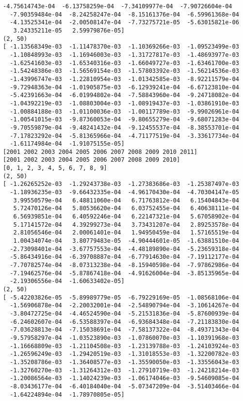 \documentclass[11pt]{article}
\begin{document}
\begin{Verbatim}[commandchars=\\\{\}]
  -4.75614743e-04  -6.13758259e-04  -7.34109977e-04  -7.90726604e-04
  -7.90359484e-04  -8.24258247e-04  -8.15161376e-04  -6.59961368e-04
  -4.13525341e-04  -2.00508147e-04  -7.73275721e-05  -5.63015821e-06
   3.24335211e-05   2.59979876e-05]
(2, 50)
[ -1.13568349e-03  -1.11478370e-03  -1.10369266e-03  -1.09523499e-03
  -1.10848993e-03  -1.16946003e-03  -1.31727817e-03  -1.48693977e-03
  -1.62541603e-03  -1.65340316e-03  -1.66049727e-03  -1.63461700e-03
  -1.54248386e-03  -1.56569154e-03  -1.57803392e-03  -1.56214536e-03
  -1.43996747e-03  -1.22810954e-03  -1.01342585e-03  -8.92211579e-04
  -9.72948363e-04  -1.01905875e-03  -6.12939241e-04  -6.67123810e-04
  -5.42391663e-04  -6.01994802e-04  -7.58843960e-04  -9.24718082e-04
  -1.04392219e-03  -1.08803004e-03  -1.08919437e-03  -1.03861910e-03
  -1.00884188e-03  -1.01100036e-03  -1.00117789e-03  -9.99026961e-04
  -1.00541015e-03  -9.87360053e-04  -9.80655279e-04  -9.68071283e-04
  -9.70559879e-04  -9.48241432e-04  -9.12455537e-04  -8.38553701e-04
  -7.17823292e-04  -5.81365966e-04  -4.71177519e-04  -3.33617734e-04
  -1.61174984e-04  -1.91075155e-05]
[2001 2002 2003 2004 2005 2006 2007 2008 2009 2010 2011]
[2001 2002 2003 2004 2005 2006 2007 2008 2009 2010]
[0, 1, 2, 3, 4, 5, 6, 7, 8, 9]
(2, 50)
[ -1.26265252e-03  -1.29243738e-03  -1.27383686e-03  -1.25387497e-03
  -1.18936235e-03  -9.66432335e-04  -4.96170430e-04  -4.70304147e-05
   3.99550579e-04   6.48811060e-04   6.71763812e-04   6.15404843e-04
   5.72470126e-04   5.80536620e-04   6.03752455e-04   6.40638111e-04
   6.56939851e-04   6.40592246e-04   6.22147321e-04   5.67058902e-04
   5.17141572e-04   4.39299273e-04   3.73431207e-04   2.89253578e-04
   2.81056546e-04   2.00061401e-04   1.94950459e-04   1.57165519e-04
   1.00434074e-04   3.80779483e-05  -4.90444601e-05  -1.63881510e-04
  -2.73098401e-04  -3.67757553e-04  -4.48189890e-04  -5.23659318e-04
  -5.86434916e-04  -6.39708887e-04  -6.77914630e-04  -7.19112177e-04
  -7.70782574e-04  -8.07313238e-04  -8.15940598e-04  -7.97862986e-04
  -7.19462576e-04  -5.87867418e-04  -4.91626004e-04  -3.85135965e-04
  -2.19306556e-04  -1.60633402e-05]
(2, 50)
[ -5.42203826e-05  -5.89989779e-05  -6.79229169e-05  -1.08568106e-04
  -1.56906878e-04  -2.20032001e-04  -2.54890794e-04  -3.10614267e-04
  -3.80472725e-04  -4.46524590e-04  -5.21531836e-04  -5.87600939e-04
  -6.24602607e-04  -6.53588397e-04  -6.93684348e-04  -7.21183830e-04
  -7.03628813e-04  -7.15038691e-04  -7.58137322e-04  -8.49371343e-04
  -9.57958297e-04  -1.03523890e-03  -1.07860070e-03  -1.10391968e-03
  -1.16668809e-03  -1.21104508e-03  -1.23139788e-03  -1.24103924e-03
  -1.26596249e-03  -1.29420519e-03  -1.31018553e-03  -1.32200782e-03
  -1.35208786e-03  -1.36408577e-03  -1.35590050e-03  -1.33556043e-03
  -1.32760270e-03  -1.31264312e-03  -1.27910719e-03  -1.24218214e-03
  -1.20086564e-03  -1.14024239e-03  -1.06174046e-03  -9.54609085e-04
  -8.03436177e-04  -6.40184040e-04  -5.07347209e-04  -3.51403466e-04
  -1.64224894e-04  -1.78970805e-05]

    \end{Verbatim}
\end{document}
